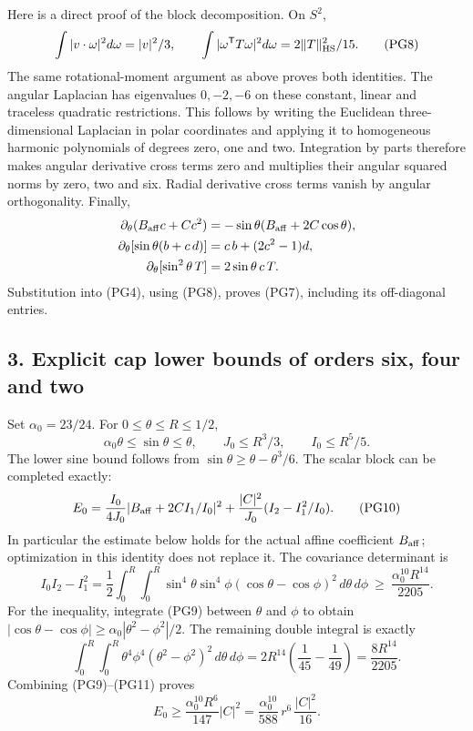 \documentclass[11pt]{article}
\begin{document}
Here is a direct proof of the block decomposition. On \(S^2\),
\[
 \int|v\cdot\omega|^2d\omega=|v|^2/3,\qquad
 \int|\omega^{\mathsf T}T\omega|^2d\omega=2\|T\|_{\rm HS}^2/15 .
 \tag{PG8}
\]
The same rotational-moment argument as above proves both identities.
The angular Laplacian has eigenvalues \(0,-2,-6\) on these constant,
linear and traceless quadratic restrictions. This follows by writing
the Euclidean three-dimensional Laplacian in polar coordinates and
applying it to homogeneous harmonic polynomials of degrees zero, one
and two. Integration by parts therefore makes angular derivative
cross terms zero and multiplies their angular squared norms by
zero, two and six. Radial derivative cross terms vanish by angular
orthogonality. Finally,
\[
 \begin{aligned}
 \partial_\theta(B_{\rm aff}c+Cc^2)&=-\sin\theta(B_{\rm aff}+2C\cos\theta),\\
 \partial_\theta[\sin\theta(b+c\,d)]
            &=c\,b+(2c^2-1)d,\\
 \partial_\theta[\sin^2\theta\,T]&=2\sin\theta\,c\,T .
 \end{aligned}
\]
Substitution into (PG4), using (PG8), proves (PG7), including its
off-diagonal entries.

\subsection*{3. Explicit cap lower bounds of orders six, four and two}

Set \(\alpha_0=23/24\). For \(0\le\theta\le R\le1/2\),
\[
 \alpha_0\theta\le\sin\theta\le\theta,\qquad
 J_0\le R^3/3,\qquad I_0\le R^5/5.
 \tag{PG9}
\]
The lower sine bound follows from
\(\sin\theta\ge\theta-\theta^3/6\).
The scalar block can be completed exactly:
\[
 E_0=\frac{I_0}{4J_0}|B_{\rm aff}+2C I_1/I_0|^2
       +\frac{|C|^2}{J_0}(I_2-I_1^2/I_0).
 \tag{PG10}
\]
In particular the estimate below holds for the actual affine
coefficient \(B_{\rm aff}\); optimization in this identity does not replace it.
The covariance determinant is
\[
 I_0I_2-I_1^2=
 \frac12\int_0^R\int_0^R
 \sin^4\theta\sin^4\phi(\cos\theta-\cos\phi)^2\,d\theta\,d\phi
 \ \ge\ \frac{\alpha_0^{10}R^{14}}{2205}.
 \tag{PG11}
\]
For the inequality, integrate (PG9) between \(\theta\) and \(\phi\)
to obtain
\(|\cos\theta-\cos\phi|\ge
\alpha_0|\theta^2-\phi^2|/2\).
The remaining double integral is exactly
\[
 \int_0^R\int_0^R\theta^4\phi^4(\theta^2-\phi^2)^2\,d\theta\,d\phi
 =2R^{14}\left(\frac1{45}-\frac1{49}\right)
 =\frac{8R^{14}}{2205}.
\]
Combining (PG9)–(PG11) proves
\[
 E_0\ge\frac{\alpha_0^{10}R^6}{147}|C|^2
       =\frac{\alpha_0^{10}}{588}\,r^6\,\frac{|C|^2}{16}.
 \tag{PG12}
\]
\end{document}
